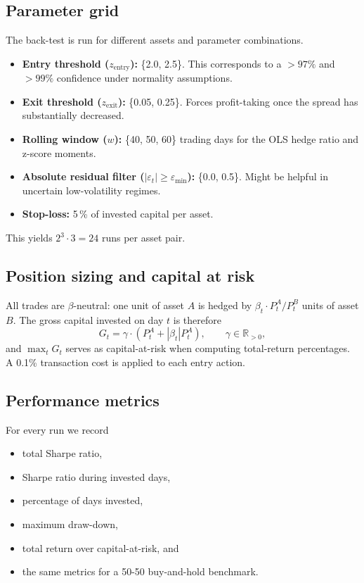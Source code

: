 \documentclass{article}
\begin{document}
\subsection{Parameter grid}
The back-test is run for different assets and parameter combinations.
\begin{itemize}
  \item \textbf{Entry threshold ($z_{\mathrm{entry}}$):} \{2.0, 2.5\}. This corresponds to a $> 97\%$ and $> 99\%$ confidence under normality assumptions.
  \item \textbf{Exit threshold ($z_{\mathrm{exit}}$):} \{0.05, 0.25\}.  Forces profit-taking once the spread has substantially decreased.
  \item \textbf{Rolling window ($w$):} \{40, 50, 60\} trading days for the
        OLS hedge ratio and z-score moments.
  \item \textbf{Absolute residual filter ($|\varepsilon_t|\ge\varepsilon_{\min}$):}
        \{0.0, 0.5\}.  Might be helpful in uncertain low-volatility regimes.
  \item \textbf{Stop-loss:} 5\,\% of invested capital per asset.
\end{itemize}
This yields $2^3 \cdot 3=24$ runs per asset pair.

\subsection{Position sizing and capital at risk}
All trades are $\beta$-neutral: one unit of asset $A$ is hedged by \(\beta_t \cdot P_t^A / P^B_t\) units of asset $B$.
The gross capital invested on day \(t\) is therefore
\[
G_t = \gamma \cdot \left( P_t^{A} + |\beta_t| P_t^{A} \right), \qquad \gamma \in \mathbb{R}_{>0},
\]
and \(\max_t G_t\) serves as capital-at-risk when computing total-return percentages. A 0.1\% transaction cost is applied to each entry action.

\subsection{Performance metrics}
For every run we record
\begin{itemize}
  \item total Sharpe ratio,
  \item Sharpe ratio during invested days,
  \item percentage of days invested,
  \item maximum draw-down,
  \item total return over capital-at-risk, and
  \item the same metrics for a 50-50 buy-and-hold benchmark.
\end{itemize}
\newpage
\end{document}
